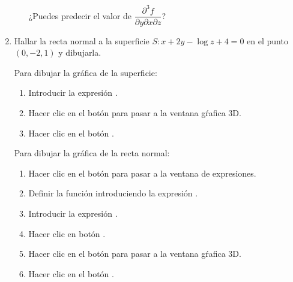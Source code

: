 \begin{enumerate}[leftmargin=*]
\begin{enumerate}
¿Puedes predecir el valor de $\dfrac{{\partial ^3 f}} {{\partial y\partial x\partial z}}$?
\end{enumerate}

\item Hallar la recta normal a la superficie $S: x+2y-\log z +4 =0$ en el punto $(0,-2,1)$ y dibujarla.
\begin{indicacion}
{Para dibujar la gráfica de la superficie:
\begin{enumerate}
\item Introducir la expresión .
\item Hacer clic en el botón  para pasar a la ventana gŕafica 3D.
\item Hacer clic en el botón .
\end{enumerate}
Para dibujar la gráfica de la recta normal:
\begin{enumerate}[resume]
\item Hacer clic en el botón  para pasar a la ventana de expresiones.
\item Definir la función introduciendo la expresión .
\item Introducir la expresión .
\item Hacer clic en botón .
\item Hacer clic en el botón  para pasar a la ventana gŕafica 3D.
\item Hacer clic en el botón .
\end{enumerate}
}
\end{indicacion}


\end{enumerate}
